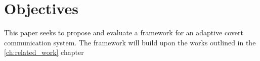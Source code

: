 \chapter{Objectives}
\label{ch:objectives}

This paper seeks to propose and evaluate a framework for an adaptive covert communication system. The framework will build upon the works outlined in the \ref{ch:related_work} chapter